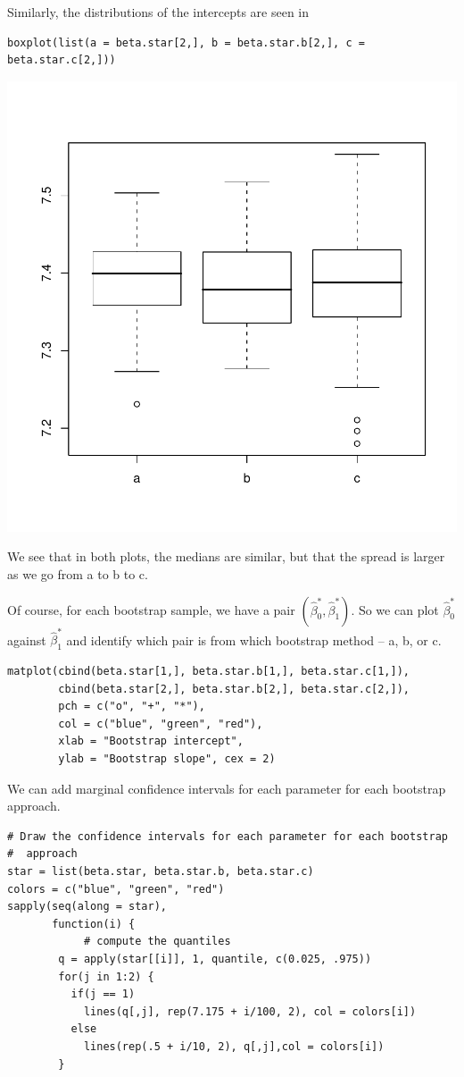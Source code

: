 \documentclass{article}
\begin{document}
\begin{description}
Similarly, the distributions of the intercepts are seen
in
\begin{verbatim}
boxplot(list(a = beta.star[2,], b = beta.star.b[2,], c = beta.star.c[2,]))
\end{verbatim}
\includegraphics{images/bootstrapSlopes.pdf}

We see that in both plots, the medians are similar, but that the
spread is larger as we go from a to b to c.

Of course, for each bootstrap sample, we have a pair $(\hat\beta_0^*,
\hat\beta_1^*)$.  So we can plot $\hat\beta_0^*$ against
$\hat\beta_1^*$ and identify which pair is from which 
bootstrap method -- a, b, or c.

\begin{verbatim}
matplot(cbind(beta.star[1,], beta.star.b[1,], beta.star.c[1,]), 
        cbind(beta.star[2,], beta.star.b[2,], beta.star.c[2,]), 
        pch = c("o", "+", "*"), 
        col = c("blue", "green", "red"),
        xlab = "Bootstrap intercept",
        ylab = "Bootstrap slope", cex = 2)
\end{verbatim}
We can add marginal confidence intervals for each parameter for
each bootstrap approach.
\begin{verbatim}
# Draw the confidence intervals for each parameter for each bootstrap
#  approach
star = list(beta.star, beta.star.b, beta.star.c)
colors = c("blue", "green", "red")
sapply(seq(along = star),
       function(i) {
            # compute the quantiles
        q = apply(star[[i]], 1, quantile, c(0.025, .975))
        for(j in 1:2) {
          if(j == 1) 
            lines(q[,j], rep(7.175 + i/100, 2), col = colors[i])
          else
            lines(rep(.5 + i/10, 2), q[,j],col = colors[i])
        }
            

\end{verbatim}
\end{description}
\end{document}
